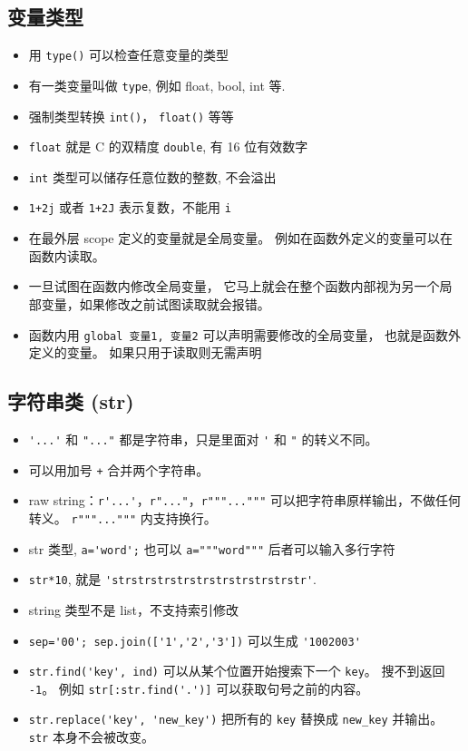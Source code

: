 \subsection{变量类型}
\begin{itemize}
\item 用 \verb`type()` 可以检查任意变量的类型
\item 有一类变量叫做 \verb`type`, 例如 float, bool, int 等.
\item 强制类型转换 \verb`int()`， \verb`float()` 等等
\item \verb`float` 就是 C 的双精度 \verb`double`, 有 16 位有效数字
\item \verb`int` 类型可以储存任意位数的整数, 不会溢出
\item \verb`1+2j` 或者 \verb`1+2J` 表示复数，不能用 \verb`i`
\item 在最外层 scope 定义的变量就是全局变量。 例如在函数外定义的变量可以在函数内读取。
\item 一旦试图在函数内修改全局变量， 它马上就会在整个函数内部视为另一个局部变量，如果修改之前试图读取就会报错。
\item 函数内用 \verb`global 变量1, 变量2` 可以声明需要修改的全局变量， 也就是函数外定义的变量。 如果只用于读取则无需声明
\end{itemize}

\subsection{字符串类 (str)}
\begin{itemize}
\item \verb`'...'` 和 \verb`"..."` 都是字符串，只是里面对 \verb`'` 和 \verb`"` 的转义不同。
\item 可以用加号 \verb`+` 合并两个字符串。
\item raw string：\verb`r'...'`，\verb`r"..."`，\verb`r"""..."""` 可以把字符串原样输出，不做任何转义。 \verb`r"""..."""` 内支持换行。
\item str 类型, \verb`a='word';` 也可以 \verb`a="""word"""` 后者可以输入多行字符
\item \verb`str*10`, 就是 \verb`'strstrstrstrstrstrstrstrstrstr'`.
\item string 类型不是 list，不支持索引修改
\item \verb`sep='00'; sep.join(['1','2','3'])` 可以生成 \verb`'1002003'`
\item \verb`str.find('key', ind)` 可以从某个位置开始搜索下一个 \verb`key`。 搜不到返回 \verb`-1`。 例如 \verb`str[:str.find('.')]` 可以获取句号之前的内容。
\item \verb`str.replace('key', 'new_key')` 把所有的 \verb`key` 替换成 \verb`new_key` 并输出。 \verb`str` 本身不会被改变。
\end{itemize}

